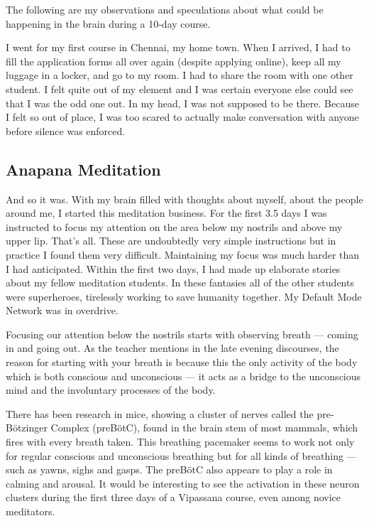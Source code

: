 \documentclass[a4paper, amsfonts, amssymb, amsmath, reprint, showkeys, nofootinbib, twoside]{revtex4-1}
\begin{document}
The following are my observations and speculations about what could be happening
in the brain during a 10-day course.

I went for my first course in Chennai, my home town. When I arrived, I had to fill
the application forms all over again (despite applying online), keep all my
luggage in a locker, and go to my room. I had to share the room with one other
student. I felt quite out of my element and I was certain everyone else could see
that I was the odd one out. In my head, I was not supposed to be there. Because I felt
so out of place, I was too scared to actually make conversation with anyone before
silence was enforced.

\subsection{Anapana Meditation}

And so it was. With my brain filled with thoughts about myself, about the people
around me, I started this meditation business. For the first 3.5 days I was instructed
to focus my attention on the area below my nostrils and above my upper
lip. That's all. These are undoubtedly very simple instructions but in practice I
found them very difficult. Maintaining my focus was much harder than I had
anticipated. Within the first two days, I had made up elaborate stories about my
fellow meditation students. In these fantasies all of the other students were
superheroes, tirelessly working to save humanity together. My Default Mode Network
was in overdrive.

Focusing our attention below the nostrils starts with observing breath --- coming in
and going out. As the teacher mentions in the late evening discourses, the reason for
starting with your breath is because this the only activity of the body which is both
conscious and unconscious --- it acts as a bridge to the unconscious mind and the
involuntary processes of the body.

There has been research in mice, showing a cluster of nerves called the
pre-Bötzinger Complex (preBötC), found in the brain stem of most mammals, which fires
with every breath taken. This breathing pacemaker seems to work not only for regular
conscious and unconscious breathing but for all kinds of breathing --- such as yawns,
sighs and gasps. The preBötC also appears to play a role in calming and
arousal. \cite{prebotcgeneration} It would be interesting to see the activation in
these neuron clusters during the first three days of a Vipassana course, even among
novice meditators.
\end{document}
